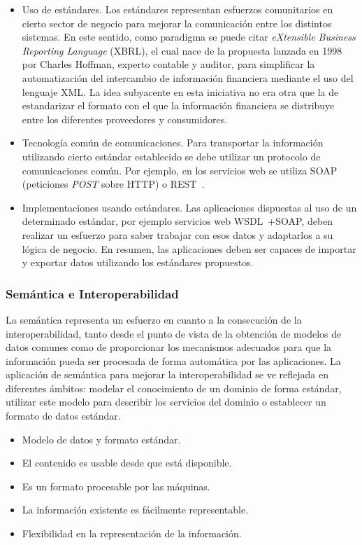 \begin{itemize}
\item Uso de estándares. Los estándares representan esfuerzos comunitarios en
cierto sector de negocio para mejorar la comunicación entre los distintos
sistemas. En este sentido, como paradigma se puede citar \textit{eXtensible Business
Reporting Language}  (\gls{XBRL}), el cual nace de la
propuesta lanzada en 1998 por Charles Hoffman, experto contable y auditor, para
simplificar la automatización del intercambio de información financiera mediante
el uso del lenguaje \gls{XML}. La idea subyacente en esta iniciativa no era otra que la
de estandarizar el formato con el que la información financiera se distribuye
entre los diferentes proveedores y consumidores.

\item Tecnología común de comunicaciones. Para transportar la información
utilizando cierto estándar establecido se debe utilizar un protocolo de
comunicaciones común. Por ejemplo, en los servicios web se utiliza
\gls{SOAP}~\cite{SOAP11} (peticiones \textit{\gls{POST}} sobre \gls{HTTP}) o \gls{REST}~\cite{rest}.

\item Implementaciones usando estándares. Las aplicaciones dispuestas al uso de
un determinado estándar, por ejemplo servicios web \gls{WSDL}~\cite{WSDL}+SOAP, deben realizar un
esfuerzo para saber trabajar con esos datos y adaptarlos a su lógica de negocio.
En resumen, las aplicaciones deben ser capaces de importar y exportar datos
utilizando los estándares propuestos.
\end{itemize}

\subsubsection{Semántica e Interoperabilidad}
La semántica representa un esfuerzo en cuanto a la consecución de la
interoperabilidad, tanto desde el punto de vista de la obtención de modelos de datos
comunes como de proporcionar los mecanismos adecuados para que la información
pueda ser procesada de forma automática por las aplicaciones. La aplicación de
semántica para mejorar la interoperabilidad se ve reflejada en diferentes
ámbitos: modelar el conocimiento de un dominio de forma estándar, utilizar este
modelo para describir los servicios del dominio o establecer un formato de
datos estándar. 

\begin{itemize}
\item Modelo de datos y formato estándar.
\item  El contenido es usable desde que está disponible.
\item  Es un formato procesable por las máquinas.
\item La información existente es fácilmente representable.
\item Flexibilidad en la representación de la información.
\end{itemize}

